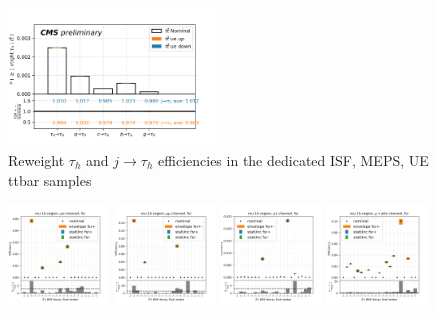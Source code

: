 \begin{figure}
    \includegraphics[width=0.49\textwidth]{chapters/Appendix/sectionTTSyst/figures/2020_MCRatio_ue_tauGenFlavor_tauVTight.png}
    \caption{Reweight $\tau_h$ and $j \to \tau_h$ efficiencies in the dedicated ISF, MEPS, UE ttbar samples}
    \label{fig:appendix:reweighttt:sf}
\end{figure}


\begin{figure}
    \centering
    \includegraphics[width=0.24\textwidth]{chapters/Appendix/sectionTTSyst/figures/afterCorr/icata0_ch0_fsr.png}
    \includegraphics[width=0.24\textwidth]{chapters/Appendix/sectionTTSyst/figures/afterCorr/icata0_ch1_fsr.png}
    \includegraphics[width=0.24\textwidth]{chapters/Appendix/sectionTTSyst/figures/afterCorr/icata0_ch2_fsr.png}
    \includegraphics[width=0.24\textwidth]{chapters/Appendix/sectionTTSyst/figures/afterCorr/icata0_ch3_fsr.png}


\end{figure}
